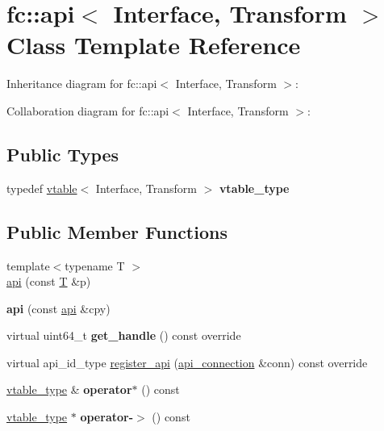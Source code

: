 \hypertarget{classfc_1_1api}{}\section{fc\+:\+:api$<$ Interface, Transform $>$ Class Template Reference}
\label{classfc_1_1api}


Inheritance diagram for fc\+:\+:api$<$ Interface, Transform $>$\+:


Collaboration diagram for fc\+:\+:api$<$ Interface, Transform $>$\+:
\subsection*{Public Types}
\begin{DoxyCompactItemize}
\item 
\mbox{\label{classfc_1_1api_a11b72f22d33b7b21a6e3768f2f5876a2}} 
typedef \mbox{\hyperlink{structfc_1_1vtable}{vtable}}$<$ Interface, Transform $>$ {\bfseries vtable\+\_\+type}
\end{DoxyCompactItemize}
\subsection*{Public Member Functions}
\begin{DoxyCompactItemize}
\item 
{\footnotesize template$<$typename T $>$ }\\\mbox{\hyperlink{classfc_1_1api_aa98da82a201c30c8efd4cad46c878a8b}{api}} (const \mbox{\hyperlink{struct_t}{T}} \&p)
\item 
\mbox{\label{classfc_1_1api_a6c20ba1caacd7897d0d0579df8a6ba1a}} 
{\bfseries api} (const \mbox{\hyperlink{classfc_1_1api}{api}} \&cpy)
\item 
\mbox{\label{classfc_1_1api_a3a8b466e0de4641b7afec6cf846492c5}} 
virtual uint64\+\_\+t {\bfseries get\+\_\+handle} () const override
\item 
virtual api\+\_\+id\+\_\+type \mbox{\hyperlink{classfc_1_1api_a0fc48f47c158c42785ac9a7b21bf8788}{register\+\_\+api}} (\mbox{\hyperlink{classfc_1_1api__connection}{api\+\_\+connection}} \&conn) const override
\item 
\mbox{\label{classfc_1_1api_a5340a6682e5f47f2e0a6761fb126391f}} 
\mbox{\hyperlink{structfc_1_1vtable}{vtable\+\_\+type}} \& {\bfseries operator$\ast$} () const
\item 
\mbox{\label{classfc_1_1api_a0e0506ac81fd37177b65e4ed9633a360}} 
\mbox{\hyperlink{structfc_1_1vtable}{vtable\+\_\+type}} $\ast$ {\bfseries operator-\/$>$} () const
\end{DoxyCompactItemize}
